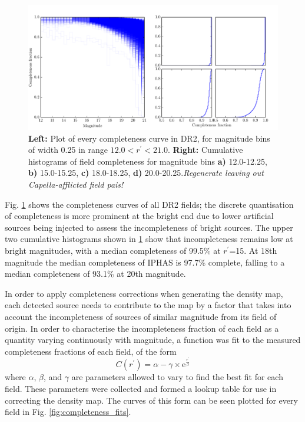 \documentclass[a4paper,useAMS,usenatbib]{mn2e}
\begin{document}
\begin{figure}
\begin{center}
\includegraphics[width=1\textwidth]{figures/completeness_curves.pdf} 
\caption{\footnotesize \textbf{Left:} Plot of every completeness curve in DR2, for magnitude bins of width 0.25 in range $12.0<r^{\prime}<21.0$. \textbf{Right:} Cumulative histograms of field completeness for magnitude bins \textbf{a)} 12.0-12.25, \textbf{b)} 15.0-15.25, \textbf{c)} 18.0-18.25, \textbf{d)} 20.0-20.25.\textit{Regenerate leaving out Capella-afflicted field pais!}}
\label{fig:completeness_curves}
\end{center}
\end{figure}

Fig. \ref{fig:completeness_curves} shows the completeness curves of all DR2 fields; the discrete quantisation of completeness is more prominent at the bright end due to lower artificial sources being injected to assess the incompleteness of bright sources. The upper two cumulative histograms shown in \ref{fig:completeness_curves} show that incompleteness remains low at bright magnitudes, with a median completeness of 99.5\% at $r^{\prime}$=15. At 18th magnitude the median completeness of IPHAS is 97.7\% complete, falling to a median completeness of 93.1\% at 20th magnitude.

In order to apply completeness corrections when generating the density map, each detected source needs to contribute to the map by a factor that takes into account the incompleteness of sources of similar magnitude from its field of origin. In order to characterise the incompleteness fraction of each field as a quantity varying continuously with magnitude, a function was fit to the measured completeness fractions of each field, of the form
\begin{equation}
C(r^{\prime}) = \alpha - \gamma \times \mathrm{e}^{\frac{r^{\prime}}{\beta}}
\label{eq:completeness_curve}
\end{equation}
\noindent where $\alpha$, $\beta$, and $\gamma$ are parameters allowed to vary to find the best fit for each field. These parameters were collected and formed a lookup table for use in correcting the density map. The curves of this form can be seen plotted for every field in Fig. \ref{fig:completeness_fits}.
\end{document}
